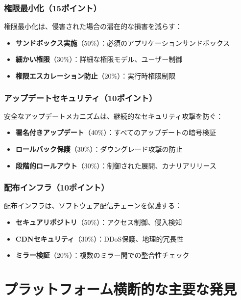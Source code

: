 \documentclass[Specialissue]{jsaiart}
\begin{document}
\subsubsection{権限最小化（15ポイント）}

権限最小化は、侵害された場合の潜在的な損害を減らす：

\begin{itemize}
    \item \textbf{サンドボックス実施}（50\%）：必須のアプリケーションサンドボックス
    \item \textbf{細かい権限}（30\%）：詳細な権限モデル、ユーザー制御
    \item \textbf{権限エスカレーション防止}（20\%）：実行時権限制限
\end{itemize}

\subsubsection{アップデートセキュリティ（10ポイント）}

安全なアップデートメカニズムは、継続的なセキュリティ攻撃を防ぐ：

\begin{itemize}
    \item \textbf{署名付きアップデート}（40\%）：すべてのアップデートの暗号検証
    \item \textbf{ロールバック保護}（30\%）：ダウングレード攻撃の防止
    \item \textbf{段階的ロールアウト}（30\%）：制御された展開、カナリアリリース
\end{itemize}

\subsubsection{配布インフラ（10ポイント）}

配布インフラは、ソフトウェア配信チェーンを保護する：

\begin{itemize}
    \item \textbf{セキュアリポジトリ}（50\%）：アクセス制御、侵入検知
    \item \textbf{CDNセキュリティ}（30\%）：DDoS保護、地理的冗長性
    \item \textbf{ミラー検証}（20\%）：複数のミラー間での整合性チェック
\end{itemize}

\section{プラットフォーム横断的な主要な発見}
\end{document}
